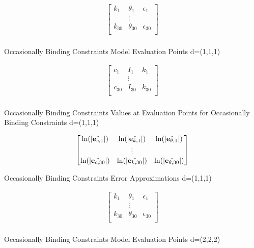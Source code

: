 \documentclass[12pt]{article}
\begin{document}
 \begin{table}
   \centering
  
 \begin{gather*}
   \begin{bmatrix}
     k_1&\theta_1&\epsilon_1\\
 &\vdots\\
     k_{30}&\theta_{30}&\epsilon_{30}\\
   \end{bmatrix}\\
%  
 \end{gather*}

   \caption{Occasionally Binding Constraints Model Evaluation Points \label{evalpobcA} d=(1,1,1)}
 \end{table}


\begin{table}
  \centering
  
\begin{gather*}
  \begin{bmatrix}
    c_1&I_1&k_1\\
&\vdots\\
    c_{30}&I_{30}&k_{30}\\
  \end{bmatrix}\\
% 
\end{gather*}

  \caption{Occasionally Binding Constraints Values at Evaluation Points for Occasionally Binding Constraints \label{valatobcA}  d=(1,1,1)}
\end{table}

 \begin{table}
   \centering
  
   \begin{gather*}
\forEstErr\\
%   
   \end{gather*}
   \caption{Occasionally Binding Constraints Error Approximations\label{esterrobcA}  d=(1,1,1)}
 \end{table}





 \begin{table}
   \centering
  
 \begin{gather*}
   \begin{bmatrix}
     k_1&\theta_1&\epsilon_1\\
 &\vdots\\
     k_{30}&\theta_{30}&\epsilon_{30}\\
   \end{bmatrix}\\
%  
 \end{gather*}

   \caption{Occasionally Binding Constraints Model Evaluation Points \label{evalpobcB} d=(2,2,2)}
 \end{table}
\end{document}
